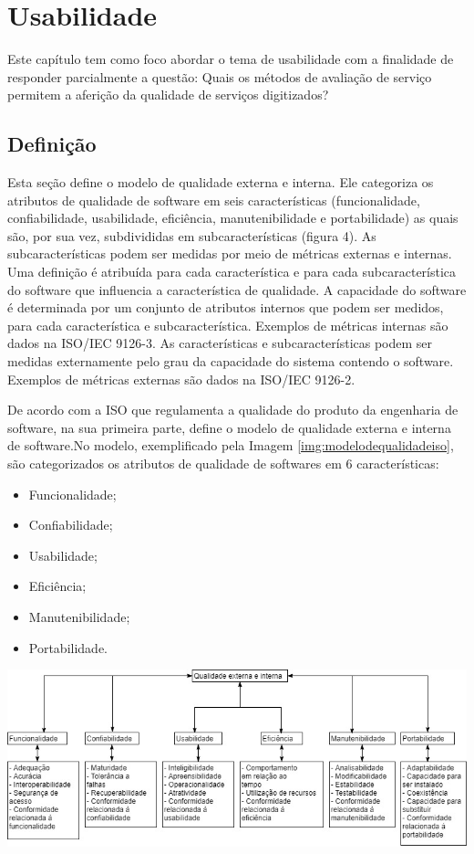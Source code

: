 \chapter[Usabilidade]{Usabilidade}
Este capítulo tem como foco abordar o tema de usabilidade com a finalidade de responder parcialmente a questão: Quais os métodos de avaliação de serviço permitem a aferição da qualidade de serviços digitizados? 

\section{Definição}

Esta seção define o modelo de qualidade externa e interna. Ele categoriza os atributos de qualidade de software em seis
características (funcionalidade, confiabilidade, usabilidade, eficiência, manutenibilidade e portabilidade) as quais são, por
sua vez, subdivididas em subcaracterísticas (figura 4). As subcaracterísticas podem ser medidas por meio de métricas
externas e internas.
Uma definição é atribuída para cada característica e para cada subcaracterística do software que influencia a característica
de qualidade. A capacidade do software é determinada por um conjunto de atributos internos que podem ser medidos,
para cada característica e subcaracterística. Exemplos de métricas internas são dados na ISO/IEC 9126-3.
As características e subcaracterísticas podem ser medidas externamente pelo grau da capacidade do sistema contendo o
software. Exemplos de métricas externas são dados na ISO/IEC 9126-2.


De acordo com a ISO\cite{iso9126} que regulamenta a qualidade do produto da engenharia de software, na sua primeira parte, define o modelo de qualidade externa e interna de software.No modelo, exemplificado pela Imagem \ref{img:modelodequalidadeiso}, são categorizados os atributos de qualidade de softwares em 6 características:
\begin{itemize}
	\item{Funcionalidade;}
	\item{Confiabilidade;}
	\item{Usabilidade;}
	\item{Eficiência;}
	\item{Manutenibilidade;}
	\item{Portabilidade.}
\end{itemize}

\begin{center}
	\includegraphics[width=1\linewidth]{figuras/modelodequalidadeiso.jpg}
	\label{img:modelodequalidadeiso}
\end{center}

